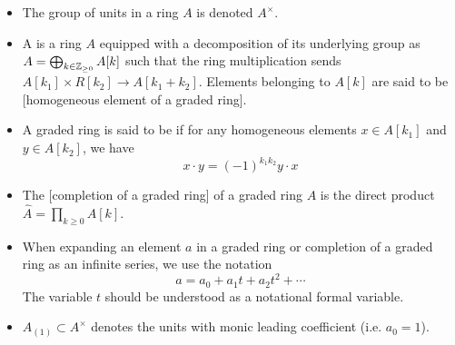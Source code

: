 \begin{itemize}
  \item The group of units in a ring $A$ is denoted $A^\times$.
  \item A  is a ring $A$ equipped with a decomposition of its underlying group as $A=\bigoplus_{k\in \mathbb{Z}_{\geq 0}} A[k]$ such that the ring multiplication sends $A[k_1]\times R[k_2] \to A[k_1+k_2]$. Elements belonging to $A[k]$ are said to be [homogeneous element of a graded ring]. 
  \item A graded ring is said to be  if for any homogeneous elements $x\in A[k_1]$ and $y\in A[k_2]$, we have
    \[
      x\cdot y = (-1)^{k_1k_2} y\cdot x
    \]
  \item The [completion of a graded ring] of a graded ring $A$ is the direct product $\widehat{A} = \prod_{k\geq 0} A[k]$.
  \item When expanding an element $a$ in a graded ring or completion of a graded ring as an infinite series, we use the notation
  \[
      a = a_0 + a_1t+a_2t^2+\cdots
  \]
  The variable $t$ should be understood as a notational formal variable.
  \item $A_{(1)}\subset A^\times$ denotes the units with monic leading coefficient (i.e. $a_0=1$).
\end{itemize}

